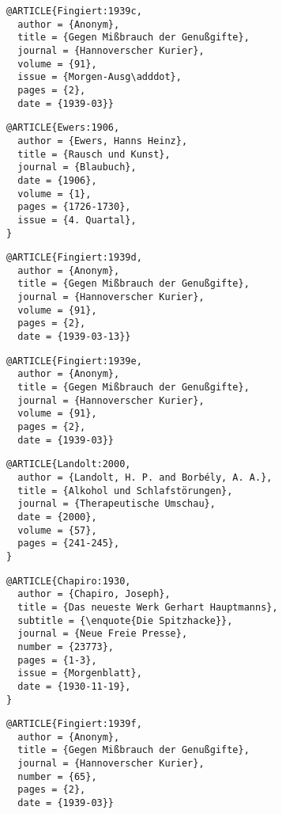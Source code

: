 \documentclass[ngerman]{scrartcl}
\begin{document}
\begin{lstlisting}
@ARTICLE{Fingiert:1939c,
  author = {Anonym},
  title = {Gegen Mißbrauch der Genußgifte},
  journal = {Hannoverscher Kurier},
  volume = {91},
  issue = {Morgen-Ausg\adddot},
  pages = {2},
  date = {1939-03}}
\end{lstlisting}


\begin{lstlisting}
@ARTICLE{Ewers:1906,
  author = {Ewers, Hanns Heinz},
  title = {Rausch und Kunst},
  journal = {Blaubuch},
  date = {1906},
  volume = {1},
  pages = {1726-1730},
  issue = {4. Quartal},
}
\end{lstlisting}

\begin{lstlisting}
@ARTICLE{Fingiert:1939d,
  author = {Anonym},
  title = {Gegen Mißbrauch der Genußgifte},
  journal = {Hannoverscher Kurier},
  volume = {91},
  pages = {2},
  date = {1939-03-13}}
\end{lstlisting}

\begin{lstlisting}
@ARTICLE{Fingiert:1939e,
  author = {Anonym},
  title = {Gegen Mißbrauch der Genußgifte},
  journal = {Hannoverscher Kurier},
  volume = {91},
  pages = {2},
  date = {1939-03}}
\end{lstlisting}

\begin{lstlisting}
@ARTICLE{Landolt:2000,
  author = {Landolt, H. P. and Borbély, A. A.},
  title = {Alkohol und Schlafstörungen},
  journal = {Therapeutische Umschau},
  date = {2000},
  volume = {57},
  pages = {241-245},
}
\end{lstlisting}

\begin{lstlisting}
@ARTICLE{Chapiro:1930,
  author = {Chapiro, Joseph},
  title = {Das neueste Werk Gerhart Hauptmanns},
  subtitle = {\enquote{Die Spitzhacke}},
  journal = {Neue Freie Presse},
  number = {23773},
  pages = {1-3},
  issue = {Morgenblatt},
  date = {1930-11-19},
}
\end{lstlisting}

\begin{lstlisting}
@ARTICLE{Fingiert:1939f,
  author = {Anonym},
  title = {Gegen Mißbrauch der Genußgifte},
  journal = {Hannoverscher Kurier},
  number = {65},
  pages = {2},
  date = {1939-03}}
\end{lstlisting}
\end{document}
